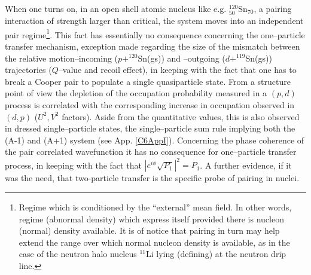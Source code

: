 When one turns on, in an open shell atomic nucleus like e.g. $^{120}_{50}$Sn$_{70}$, a pairing interaction of strength larger than critical, the system moves into an independent pair regime\footnote{Regime which is conditioned by the ``external'' mean field. In other words, regime (abnormal density) which express itself provided there is nucleon (normal) density available. It is of notice that pairing in turn may help extend the range over which normal nucleon density is available, as in the case of the neutron halo nucleus $^{11}$Li lying (defining) at the neutron drip line.}. This fact has essentially no consequence concerning the one--particle transfer mechanism, exception made regarding the size of the mismatch between the relative motion--incoming ($p+^{120}$Sn(gs)) and --outgoing ($d+^{119}$Sn(gs)) trajectories ($Q$--value and recoil effect), in keeping with the fact that one has to break a Cooper pair to populate a single  quasiparticle state. From a structure point of view the depletion of the occupation probability measured in a $(p,d)$ process is correlated with the corresponding increase in occupation observed in $(d,p)$ ($U^2,V^2$ factors). Aside  from the quantitative values, this is also observed in dressed single--particle states, the single--particle sum rule implying both the (A-1) and (A+1) system (see App. \ref{C6AppI}). Concerning the phase coherence of the pair correlated wavefunction it has no consequence for one--particle transfer process, in keeping with the fact that $|e^{i\phi}\sqrt{P_1}|^2=P_1$. A further evidence, if it was the need, that two-particle transfer is the specific probe of pairing in nuclei.


